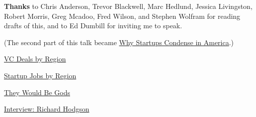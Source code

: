 \textbf{Thanks}
                  to Chris Anderson, Trevor Blackwell, Marc Hedlund, Jessica
                  Livingston, Robert Morris, Greg Mcadoo, Fred Wilson, and
                  Stephen Wolfram for reading drafts of this, and to Ed Dumbill
                  for inviting me to speak.

(The second part of this
                  talk became
                  \href{http://www.paulgraham.com/america.html}{Why Startups Condense in America}.)


              
            
          

            
              
            
            
              
                
              
              
              
                \href{http://www.pwcmoneytree.com/moneytree/nav.jsp?page=region}{VC Deals by Region}


              
              
              
                
              
              
              
                \href{http://radar.oreilly.com/archives/2006/06/startup\_centers.html}{Startup Jobs by Region}


              
            
            
              
            
            
              
            
            
              
                
              
              
              
                \href{http://www.scribd.com/doc/179382/}{They Would Be Gods}


              
              
              
                
              
              
              
                \href{http://silicongenesis.stanford.edu/transcripts/hodgson.htm}{Interview: Richard Hodgson}


